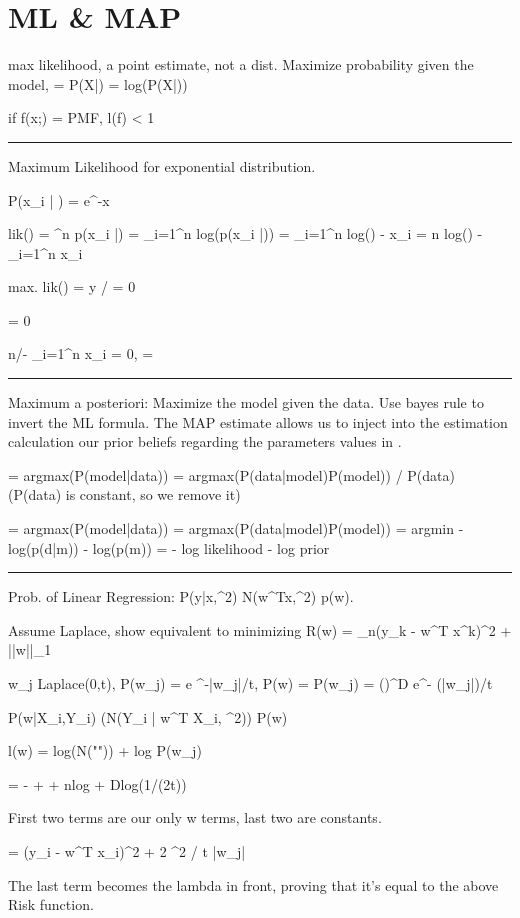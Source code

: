 \documentclass[a4paper,twoside,twocolumn]{article}
\begin{document}
\section*{ML \& MAP}
\label{sec-8}
\setlength{\parindent}{0pt}
{\scriptsize
max likelihood, a point estimate, not a dist. Maximize probability given the model,  = \product P(X|\theta) = \Sigma log(P(X|\theta))

if f(x;\theta) = PMF,  l(f) < 1

\noindent\rule{8cm}{0.4pt}

Maximum Likelihood for exponential distribution.

P(x_i | \theta) = \theta e^{-\theta x}

lik(\theta) = \prod^n p(x_i |\theta) = \sum_{i=1}^n log(p(x_i |\theta)) = \sum_{i=1}^n log(\theta) - \theta x_i = n log(\theta) - \sum_{i=1}^n \theta x_i

max. lik(\theta) = \partial y / \partial \theta = 0

 = 0

n/\theta - \sum_{i=1}^n x_i = 0, \theta = 

\noindent\rule{8cm}{0.4pt}

Maximum a posteriori: Maximize the model given the data. Use bayes rule to invert the ML formula. The MAP estimate allows us to inject into the estimation calculation our prior beliefs regarding the parameters values in \Theta.

= argmax(P(model|data)) = argmax(P(data|model)P(model)) / P(data) (P(data) is constant, so we remove it)

= argmax(P(model|data)) = argmax(P(data|model)P(model)) = argmin -log(p(d|m)) - log(p(m)) = - log likelihood - log prior

\noindent\rule{8cm}{0.4pt}

Prob. of Linear Regression: P(y|x,\sigma^2) \approx N(w^Tx,\sigma^2)  p(w).

Assume Laplace, show equivalent to minimizing R(w) = \Sigma_n(y_k - w^T x^k)^2 + \lambda ||w||_1

w_j \approx Laplace(0,t), P(w_j) =  e ^{-|w_j|/t}, P(w) = \product P(w_j) = ()^D \cdot e^{- (\Sigma|w_j|)/t}

P(w|X_i,Y_i) \propto (\prod N(Y_i | w^T X_i, \sigma^2)) \cdot P(w)

l(w) = \Sigma log(N("")) + \Sigma log P(w_j)

= - \Sigma {} +  + nlog  + Dlog(1/(2t))

First two terms are our only w terms, last two are constants.

= \Sigma(y_i - w^T x_i)^2 + 2 \sigma^2 / t \Sigma |w_j|

The last term becomes the lambda in front, proving that it's equal to the above Risk function.

}
\end{document}
